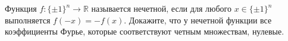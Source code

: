 Функция $f\colon \{\pm 1\}^n \to \mathbb{R}$ называется нечетной, если для любого $x \in \{\pm 1\}^n$
выполняется $f(-x) = -f(x)$. Докажите, что у нечетной функции все коэффициенты Фурье, которые
соответствуют четным множествам, нулевые.